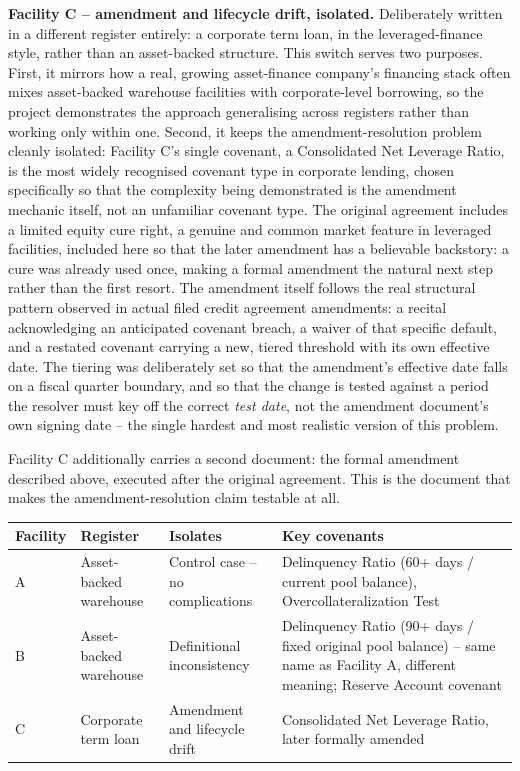 \documentclass[11pt,a4paper]{article}
\begin{document}
\textbf{Facility C -- amendment and lifecycle drift, isolated.} Deliberately written in a different register entirely: a corporate term loan, in the leveraged-finance style, rather than an asset-backed structure. This switch serves two purposes. First, it mirrors how a real, growing asset-finance company's financing stack often mixes asset-backed warehouse facilities with corporate-level borrowing, so the project demonstrates the approach generalising across registers rather than working only within one. Second, it keeps the amendment-resolution problem cleanly isolated: Facility C's single covenant, a Consolidated Net Leverage Ratio, is the most widely recognised covenant type in corporate lending, chosen specifically so that the complexity being demonstrated is the amendment mechanic itself, not an unfamiliar covenant type. The original agreement includes a limited equity cure right, a genuine and common market feature in leveraged facilities, included here so that the later amendment has a believable backstory: a cure was already used once, making a formal amendment the natural next step rather than the first resort. The amendment itself follows the real structural pattern observed in actual filed credit agreement amendments: a recital acknowledging an anticipated covenant breach, a waiver of that specific default, and a restated covenant carrying a new, tiered threshold with its own effective date. The tiering was deliberately set so that the amendment's effective date falls on a fiscal quarter boundary, and so that the change is tested against a period the resolver must key off the correct \emph{test date}, not the amendment document's own signing date -- the single hardest and most realistic version of this problem.

Facility C additionally carries a second document: the formal amendment described above, executed after the original agreement. This is the document that makes the amendment-resolution claim testable at all.

\begin{center}
\renewcommand{\arraystretch}{1.35}
\begin{tabular}{@{}p{2.1cm}p{2.6cm}p{4.3cm}p{5.4cm}@{}}
\toprule
\textbf{Facility} & \textbf{Register} & \textbf{Isolates} & \textbf{Key covenants} \\
\midrule
A & Asset-backed warehouse & Control case -- no complications & Delinquency Ratio (60+ days / current pool balance), Overcollateralization Test \\
B & Asset-backed warehouse & Definitional inconsistency & Delinquency Ratio (90+ days / fixed original pool balance) -- same name as Facility A, different meaning; Reserve Account covenant \\
C & Corporate term loan & Amendment and lifecycle drift & Consolidated Net Leverage Ratio, later formally amended \\
\bottomrule
\end{tabular}
\end{center}
\end{document}
